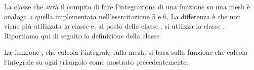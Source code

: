 La classe che avr\`a il compito di fare l'integrazione di una funzione su una mesh \`e analoga a quella implementata nell'esercitazione 5 e 6. La differenza \`e che non viene pi\`u utilizzata la classe  e, al posto della classe , si utilizza la classe . Riportiamo qui di seguito la definizione della classe 

\lstset{basicstyle=\scriptsize\sf}

\lstset{basicstyle=\sf}

La funzione , che calcola l'integrale sulla mesh, si basa sulla funzione  che calcola l'integrale su ogni triangolo come mostrato precedentemente.

\lstset{basicstyle=\scriptsize\sf}

\lstset{basicstyle=\sf}